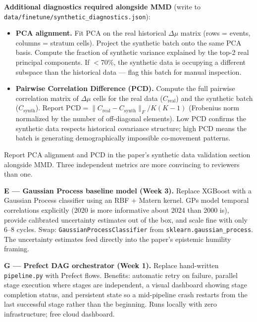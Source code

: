 \documentclass[11pt]{article}
\begin{document}
\begin{mdframed}[style=warnbox]
\textbf{Additional diagnostics required alongside MMD} (write to
\texttt{data/finetune/synthetic\_diagnostics.json}):
\begin{itemize}[leftmargin=1.6em, itemsep=2pt]
  \item \textbf{PCA alignment.} Fit PCA on the real historical $\Delta\mu$ matrix
        (rows = events, columns = stratum cells). Project the synthetic batch
        onto the same PCA basis. Compute the fraction of synthetic variance
        explained by the top-2 real principal components. If $<$70\%, the synthetic
        data is occupying a different subspace than the historical data ---
        flag this batch for manual inspection.
  \item \textbf{Pairwise Correlation Difference (PCD).} Compute the full
        pairwise correlation matrix of $\Delta\mu$ cells for the real data
        ($C_{\text{real}}$) and the synthetic batch ($C_{\text{synth}}$).
        Report $\text{PCD} = \|C_{\text{real}} - C_{\text{synth}}\|_F / K(K-1)$
        (Frobenius norm normalized by the number of off-diagonal elements).
        Low PCD confirms the synthetic data respects historical covariance
        structure; high PCD means the batch is generating demographically
        impossible co-movement patterns.
\end{itemize}
Report PCA alignment and PCD in the paper's synthetic data validation section
alongside MMD. Three independent metrics are more convincing to reviewers than
one.
\end{mdframed}

\textbf{E --- Gaussian Process baseline model (Week 3).}
Replace XGBoost with a Gaussian Process classifier using an RBF + Matern kernel.
GPs model temporal correlations explicitly (2020 is more informative about 2024
than 2000 is), provide calibrated uncertainty estimates out of the box, and scale
fine with only 6--8 cycles. Swap: \texttt{GaussianProcessClassifier} from
\texttt{sklearn.gaussian\_process}. The uncertainty estimates feed directly into
the paper's epistemic humility framing.

\textbf{G --- Prefect DAG orchestrator (Week 1).}
Replace hand-written \texttt{pipeline.py} with Prefect flows. Benefits: automatic
retry on failure, parallel stage execution where stages are independent, a visual
dashboard showing stage completion status, and persistent state so a mid-pipeline
crash restarts from the last successful stage rather than the beginning. Runs
locally with zero infrastructure; free cloud dashboard.
\end{document}
